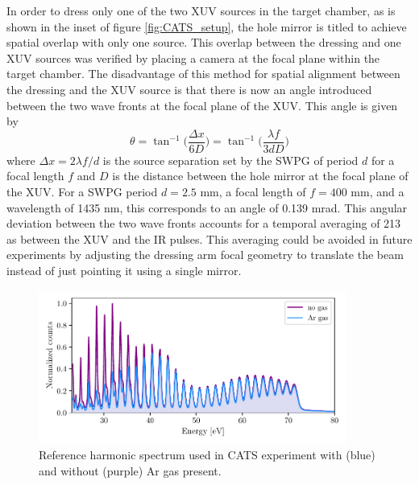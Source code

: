 In order to dress only one of the two XUV sources in the target chamber, as is shown in the inset of figure \ref{fig:CATS_setup}, the hole mirror is titled to achieve spatial overlap with only one source.  This overlap between the dressing and one XUV sources was verified by placing a camera at the focal plane within the target chamber.  The disadvantage of this method for spatial alignment between the dressing and the XUV source is that there is now an angle introduced between the two wave fronts at the focal plane of the XUV.  This angle is given by
\begin{equation}
	\theta = \tan^{-1}\bigg(\frac{\Delta x}{6 D}\bigg) = \tan^{-1}\bigg(\frac{\lambda f}{3 d D}\bigg)
\end{equation}
where $\Delta x = 2\lambda f /d$ is the source separation set by the SWPG of period $d$ for a focal length $f$ and $D$ is the distance between the hole mirror at the focal plane of the XUV. For a SWPG period $d=2.5$ mm, a focal length of $f=400$ mm, and a wavelength of 1435 nm, this corresponds to an angle of 0.139 mrad.  This angular deviation between the two wave fronts accounts for a temporal averaging of 213 as between the XUV and the IR pulses.  This averaging could be avoided in future experiments by adjusting the dressing arm focal geometry to translate the beam instead of just pointing it using a single mirror.

\begin{figure}
	\centering
	\includegraphics[width=0.9\textwidth]{figures/CATS/ref_harmonic_spectrum.pdf}
	\caption[Reference harmonic spectrum used in CATS experiment]{Reference harmonic spectrum used in CATS experiment with (blue) and without (purple) Ar gas present.}
	\label{fig:ref_harmonic_spectrum}
\end{figure}

